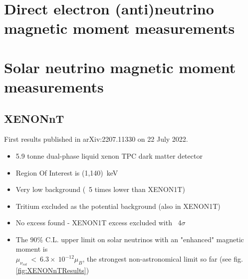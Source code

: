 \documentclass[12pt]{article}
\begin{document}
\section{Direct electron (anti)neutrino magnetic moment measurements}

\section{Solar neutrino magnetic moment measurements}
\subsection{XENONnT}
First results published in arXiv:2207.11330\cite{XENON:2022mpc} on 22 July 2022.
\begin{itemize}
    \item 5.9 tonne dual-phase liquid xenon TPC dark matter detector
    \item Region Of Interest is (1,140)~keV
    \item Very low background (~5 times lower than XENON1T)
    \item Tritium excluded as the potential background (also in XENON1T)
    \item No excess found - XENON1T excess excluded with ~4$\sigma$
    \item The $90\%$ C.L. upper limit on solar neutrinos with an "enhanced" magnetic moment is \\$\mu_{\nu_{sol}}~<~6.3\times~10^{-12}\mu_B$, the strongest non-astronomical limit so far (see fig.\ref{fig:XENONnTResults})
\end{itemize}
\end{document}
